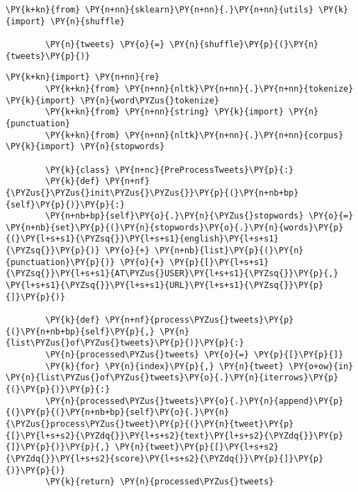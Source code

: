\begin{tcolorbox}[breakable, size=fbox, boxrule=1pt, pad at break*=1mm,colback=cellbackground, colframe=cellborder]
    \begin{Verbatim}[commandchars=\\\{\}]
        \PY{k+kn}{from} \PY{n+nn}{sklearn}\PY{n+nn}{.}\PY{n+nn}{utils} \PY{k}{import} \PY{n}{shuffle}

        \PY{n}{tweets} \PY{o}{=} \PY{n}{shuffle}\PY{p}{(}\PY{n}{tweets}\PY{p}{)}
    \end{Verbatim}
\end{tcolorbox}

\begin{tcolorbox}[breakable, size=fbox, boxrule=1pt, pad at break*=1mm,colback=cellbackground, colframe=cellborder]
    \begin{Verbatim}[commandchars=\\\{\}]
        \PY{k+kn}{import} \PY{n+nn}{re}
        \PY{k+kn}{from} \PY{n+nn}{nltk}\PY{n+nn}{.}\PY{n+nn}{tokenize} \PY{k}{import} \PY{n}{word\PYZus{}tokenize}
        \PY{k+kn}{from} \PY{n+nn}{string} \PY{k}{import} \PY{n}{punctuation}
        \PY{k+kn}{from} \PY{n+nn}{nltk}\PY{n+nn}{.}\PY{n+nn}{corpus} \PY{k}{import} \PY{n}{stopwords}

        \PY{k}{class} \PY{n+nc}{PreProcessTweets}\PY{p}{:}
        \PY{k}{def} \PY{n+nf}{\PYZus{}\PYZus{}init\PYZus{}\PYZus{}}\PY{p}{(}\PY{n+nb+bp}{self}\PY{p}{)}\PY{p}{:}
        \PY{n+nb+bp}{self}\PY{o}{.}\PY{n}{\PYZus{}stopwords} \PY{o}{=} \PY{n+nb}{set}\PY{p}{(}\PY{n}{stopwords}\PY{o}{.}\PY{n}{words}\PY{p}{(}\PY{l+s+s1}{\PYZsq{}}\PY{l+s+s1}{english}\PY{l+s+s1}{\PYZsq{}}\PY{p}{)} \PY{o}{+} \PY{n+nb}{list}\PY{p}{(}\PY{n}{punctuation}\PY{p}{)} \PY{o}{+} \PY{p}{[}\PY{l+s+s1}{\PYZsq{}}\PY{l+s+s1}{AT\PYZus{}USER}\PY{l+s+s1}{\PYZsq{}}\PY{p}{,} \PY{l+s+s1}{\PYZsq{}}\PY{l+s+s1}{URL}\PY{l+s+s1}{\PYZsq{}}\PY{p}{]}\PY{p}{)}

        \PY{k}{def} \PY{n+nf}{process\PYZus{}tweets}\PY{p}{(}\PY{n+nb+bp}{self}\PY{p}{,} \PY{n}{list\PYZus{}of\PYZus{}tweets}\PY{p}{)}\PY{p}{:}
        \PY{n}{processed\PYZus{}tweets} \PY{o}{=} \PY{p}{[}\PY{p}{]}
        \PY{k}{for} \PY{n}{index}\PY{p}{,} \PY{n}{tweet} \PY{o+ow}{in} \PY{n}{list\PYZus{}of\PYZus{}tweets}\PY{o}{.}\PY{n}{iterrows}\PY{p}{(}\PY{p}{)}\PY{p}{:}
        \PY{n}{processed\PYZus{}tweets}\PY{o}{.}\PY{n}{append}\PY{p}{(}\PY{p}{(}\PY{n+nb+bp}{self}\PY{o}{.}\PY{n}{\PYZus{}process\PYZus{}tweet}\PY{p}{(}\PY{n}{tweet}\PY{p}{[}\PY{l+s+s2}{\PYZdq{}}\PY{l+s+s2}{text}\PY{l+s+s2}{\PYZdq{}}\PY{p}{]}\PY{p}{)}\PY{p}{,} \PY{n}{tweet}\PY{p}{[}\PY{l+s+s2}{\PYZdq{}}\PY{l+s+s2}{score}\PY{l+s+s2}{\PYZdq{}}\PY{p}{]}\PY{p}{)}\PY{p}{)}
        \PY{k}{return} \PY{n}{processed\PYZus{}tweets}


\end{Verbatim}
\end{tcolorbox}
